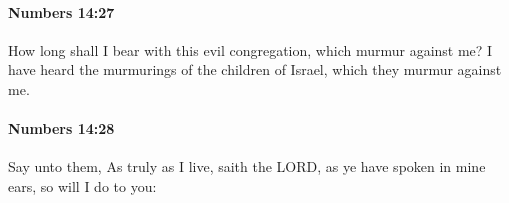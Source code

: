 		\paragraph{Numbers 14:27} %
			\label{NUMBERS-14-27}

			How long shall I bear with this evil congregation, which murmur against me? I have heard the murmurings of the children of Israel, which they murmur against me.


		\paragraph{Numbers 14:28} %
			\label{NUMBERS-14-28}

			Say unto them, As truly as I live, saith the LORD, as ye have spoken in mine ears, so will I do to you:


